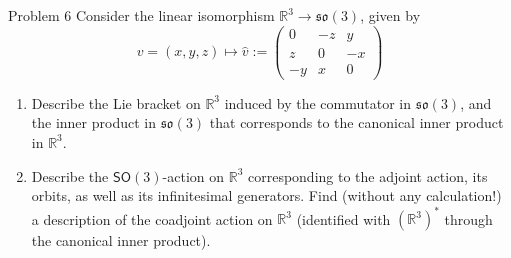 \begin{thing4}{Problem 6}\leavevmode
	Consider the linear isomorphism $\mathbb{R}^{3}\to \mathfrak{so}(3)$, given by
	\[v=(x,y,z)\longmapsto \hat{v}:=\begin{pmatrix} 0&-z&y\\z&0&-x\\-y&x&0 \end{pmatrix} \]
	\begin{enumerate}[label=\alph*.]
		\item Describe the Lie bracket on $\mathbb{R}^{3}$ induced by the commutator in $\mathfrak{so}(3)$, and the inner product in $\mathfrak{so}(3)$ that corresponds to the canonical inner product in $\mathbb{R}^{3}$.

		\item Describe the $\mathsf{SO}(3)$-action on $\mathbb{R}^{3}$ corresponding to the adjoint action, its orbits, as well as its infinitesimal generators. Find (without any calculation!) a description of the coadjoint action on $\mathbb{R}^{3}$ (identified with $(\mathbb{R}^{3})^*$ through the canonical inner product).
	\end{enumerate}
\end{thing4}

